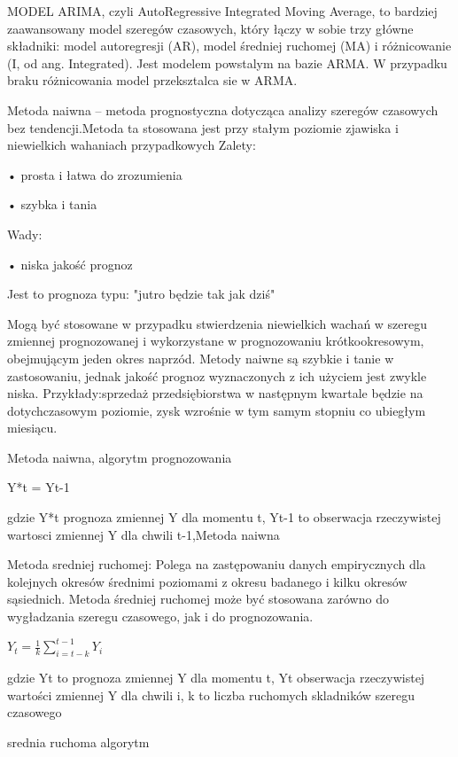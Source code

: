 MODEL ARIMA, czyli AutoRegressive Integrated Moving Average, to bardziej zaawansowany model szeregów czasowych, który łączy w sobie trzy główne składniki: model autoregresji (AR), model średniej ruchomej (MA) i różnicowanie (I, od ang. Integrated).  Jest modelem powstalym na bazie ARMA. W przypadku braku różnicowania model przeksztalca sie w ARMA.\cite{Musz2012}\cite{Farz2020}


 Metoda naiwna – metoda prognostyczna dotycząca analizy szeregów czasowych bez tendencji.Metoda ta stosowana jest przy stałym poziomie zjawiska i niewielkich wahaniach przypadkowych
Zalety: 

    • prosta i łatwa do zrozumienia 
    
    • szybka i tania

Wady:

    • niska jakość prognoz 
    
    Jest to prognoza typu: "jutro będzie tak jak dziś"
 \cite{naiw2023}\cite{Shekh2018} 

Mogą być stosowane w przypadku stwierdzenia niewielkich wachań w szeregu zmiennej prognozowanej i wykorzystane w prognozowaniu krótkookresowym, obejmującym jeden okres naprzód. 
Metody naiwne są szybkie i tanie w zastosowaniu, jednak jakość prognoz wyznaczonych z ich użyciem jest zwykle niska.
Przykłady:sprzedaż przedsiębiorstwa w następnym  kwartale będzie na dotychczasowym poziomie,
zysk wzrośnie w tym samym stopniu co ubiegłym miesiącu.\cite{szer2009}

Metoda naiwna, algorytm prognozowania

Y*t = Yt-1

gdzie Y*t prognoza zmiennej Y dla momentu t, Yt-1 to obserwacja rzeczywistej wartosci zmiennej Y dla chwili t-1,Metoda naiwna\cite{szer2009}



Metoda sredniej ruchomej:  Polega na zastępowaniu danych empirycznych dla kolejnych okresów średnimi poziomami z okresu badanego i kilku okresów sąsiednich. Metoda średniej ruchomej może być stosowana zarówno do wygładzania szeregu czasowego, jak i do prognozowania.

\(Y_t = \frac{1}{k} \sum_{i=t-k}^{t-1} Y_i\)

gdzie Yt to prognoza zmiennej Y dla momentu t, Yt obserwacja rzeczywistej wartości zmiennej Y dla chwili i, k to liczba ruchomych skladników szeregu czasowego

srednia ruchoma algorytm\cite{szer2009}



